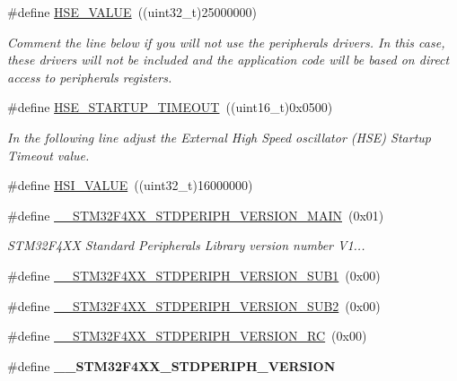 \begin{DoxyCompactItemize}
\item 
\#define \hyperlink{group___library__configuration__section_gaeafcff4f57440c60e64812dddd13e7cb}{H\+S\+E\+\_\+\+V\+A\+L\+UE}~((uint32\+\_\+t)25000000)
\begin{DoxyCompactList}\small\item\em Comment the line below if you will not use the peripherals drivers. In this case, these drivers will not be included and the application code will be based on direct access to peripherals registers. \end{DoxyCompactList}\item 
\#define \hyperlink{group___library__configuration__section_ga68ecbc9b0a1a40a1ec9d18d5e9747c4f}{H\+S\+E\+\_\+\+S\+T\+A\+R\+T\+U\+P\+\_\+\+T\+I\+M\+E\+O\+UT}~((uint16\+\_\+t)0x0500)
\begin{DoxyCompactList}\small\item\em In the following line adjust the External High Speed oscillator (H\+SE) Startup Timeout value. \end{DoxyCompactList}\item 
\#define \hyperlink{group___library__configuration__section_gaaa8c76e274d0f6dd2cefb5d0b17fbc37}{H\+S\+I\+\_\+\+V\+A\+L\+UE}~((uint32\+\_\+t)16000000)
\item 
\#define \hyperlink{group___library__configuration__section_gab16ffe03509714c63d5e530131c494f4}{\+\_\+\+\_\+\+S\+T\+M32\+F4\+X\+X\+\_\+\+S\+T\+D\+P\+E\+R\+I\+P\+H\+\_\+\+V\+E\+R\+S\+I\+O\+N\+\_\+\+M\+A\+IN}~(0x01)
\begin{DoxyCompactList}\small\item\em S\+T\+M32\+F4\+XX Standard Peripherals Library version number V1... \end{DoxyCompactList}\item 
\#define \hyperlink{group___library__configuration__section_gadce716e810a51b042298fb21b63e5366}{\+\_\+\+\_\+\+S\+T\+M32\+F4\+X\+X\+\_\+\+S\+T\+D\+P\+E\+R\+I\+P\+H\+\_\+\+V\+E\+R\+S\+I\+O\+N\+\_\+\+S\+U\+B1}~(0x00)
\item 
\#define \hyperlink{group___library__configuration__section_ga4b16607e43a35289dc5ebb608b1261d4}{\+\_\+\+\_\+\+S\+T\+M32\+F4\+X\+X\+\_\+\+S\+T\+D\+P\+E\+R\+I\+P\+H\+\_\+\+V\+E\+R\+S\+I\+O\+N\+\_\+\+S\+U\+B2}~(0x00)
\item 
\#define \hyperlink{group___library__configuration__section_gad5bec5e54ac96b9238a6363f2088f85c}{\+\_\+\+\_\+\+S\+T\+M32\+F4\+X\+X\+\_\+\+S\+T\+D\+P\+E\+R\+I\+P\+H\+\_\+\+V\+E\+R\+S\+I\+O\+N\+\_\+\+RC}~(0x00)
\item 
\#define {\bfseries \+\_\+\+\_\+\+S\+T\+M32\+F4\+X\+X\+\_\+\+S\+T\+D\+P\+E\+R\+I\+P\+H\+\_\+\+V\+E\+R\+S\+I\+ON}
\end{DoxyCompactItemize}


